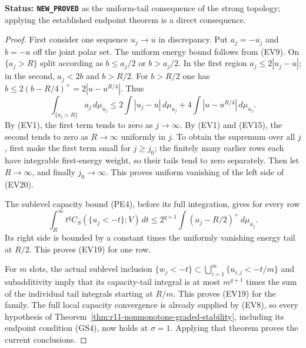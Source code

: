 \noindent\textbf{Status: \texttt{NEW\_PROVED}} as the
uniform-tail consequence of the strong topology; applying
the established endpoint theorem is a direct consequence.

\begin{proof}
First consider one sequence $u_j\to u$ in discrepancy.
Put $a_j=-u_j$ and $b=-u$ off the joint polar set.
The uniform energy bound follows from (EV9). On
$\{a_j>R\}$ split according as $b\leq a_j/2$ or
$b>a_j/2$. In the first region $a_j\leq2|u_j-u|$;
in the second, $a_j<2b$ and $b>R/2$.
For $b>R/2$ one has
$b\leq2(b-R/4)^+=2|u-u^{R/4}|$.
Thus
\[
 \int_{\{a_j>R\}}a_j\,d\mu_{u_j}
    \leq2\int|u_j-u|\,d\mu_{u_j}
             +4\int|u-u^{R/4}|\,d\mu_{u_j}.
 \tag{EV20}
\]
By (EV1), the first term tends to zero as $j\to\infty$.
By (EV1) and (EV15), the second tends to zero as
$R\to\infty$ uniformly in $j$. To obtain the supremum
over all $j$, first make the first term small for
$j\geq j_0$; the finitely many earlier rows each have
integrable first-energy weight, so their tails tend
to zero separately. Then let $R\to\infty$, and finally
$j_0\to\infty$. This proves uniform vanishing of the
left side of (EV20).

The sublevel capacity bound (PE4), before its full
integration, gives for every row
\[
 \int_R^\infty t^q C_S(\{u_j<-t\};V)\,dt
       \leq2^{q+1}\int(a_j-R/2)^+\,d\mu_{u_j}.
 \tag{EV21}
\]
Its right side is bounded by a constant times the
uniformly vanishing energy tail at $R/2$.
This proves (EV19) for one row.

For $m$ slots, the actual sublevel inclusion
$\{w_j<-t\}\subset\bigcup_{i=1}^m\{u_{i,j}<-t/m\}$
and subadditivity imply that its capacity-tail integral
is at most $m^{q+1}$ times the sum of the individual
tail integrals starting at $R/m$. This proves (EV19)
for the family. The full local capacity convergence is
already supplied by (EV8), so every hypothesis of
Theorem~\ref{thm:r11-nonmonotone-graded-stability}, including
its endpoint condition (GS4), now holds at $\sigma=1$.
Applying that theorem proves the current conclusions.
\end{proof}
